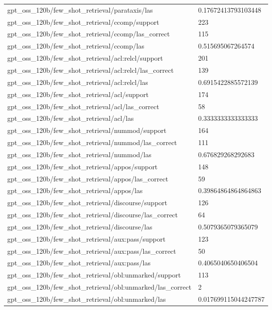 \begin{tabular}{ll}
gpt\_oss\_120b/few\_shot\_retrieval/parataxis/las & 0.17672413793103448 \\
gpt\_oss\_120b/few\_shot\_retrieval/ccomp/support & 223 \\
gpt\_oss\_120b/few\_shot\_retrieval/ccomp/las\_correct & 115 \\
gpt\_oss\_120b/few\_shot\_retrieval/ccomp/las & 0.515695067264574 \\
gpt\_oss\_120b/few\_shot\_retrieval/acl:relcl/support & 201 \\
gpt\_oss\_120b/few\_shot\_retrieval/acl:relcl/las\_correct & 139 \\
gpt\_oss\_120b/few\_shot\_retrieval/acl:relcl/las & 0.6915422885572139 \\
gpt\_oss\_120b/few\_shot\_retrieval/acl/support & 174 \\
gpt\_oss\_120b/few\_shot\_retrieval/acl/las\_correct & 58 \\
gpt\_oss\_120b/few\_shot\_retrieval/acl/las & 0.3333333333333333 \\
gpt\_oss\_120b/few\_shot\_retrieval/nummod/support & 164 \\
gpt\_oss\_120b/few\_shot\_retrieval/nummod/las\_correct & 111 \\
gpt\_oss\_120b/few\_shot\_retrieval/nummod/las & 0.676829268292683 \\
gpt\_oss\_120b/few\_shot\_retrieval/appos/support & 148 \\
gpt\_oss\_120b/few\_shot\_retrieval/appos/las\_correct & 59 \\
gpt\_oss\_120b/few\_shot\_retrieval/appos/las & 0.39864864864864863 \\
gpt\_oss\_120b/few\_shot\_retrieval/discourse/support & 126 \\
gpt\_oss\_120b/few\_shot\_retrieval/discourse/las\_correct & 64 \\
gpt\_oss\_120b/few\_shot\_retrieval/discourse/las & 0.5079365079365079 \\
gpt\_oss\_120b/few\_shot\_retrieval/aux:pass/support & 123 \\
gpt\_oss\_120b/few\_shot\_retrieval/aux:pass/las\_correct & 50 \\
gpt\_oss\_120b/few\_shot\_retrieval/aux:pass/las & 0.4065040650406504 \\
gpt\_oss\_120b/few\_shot\_retrieval/obl:unmarked/support & 113 \\
gpt\_oss\_120b/few\_shot\_retrieval/obl:unmarked/las\_correct & 2 \\
gpt\_oss\_120b/few\_shot\_retrieval/obl:unmarked/las & 0.017699115044247787 \\

\end{tabular}
